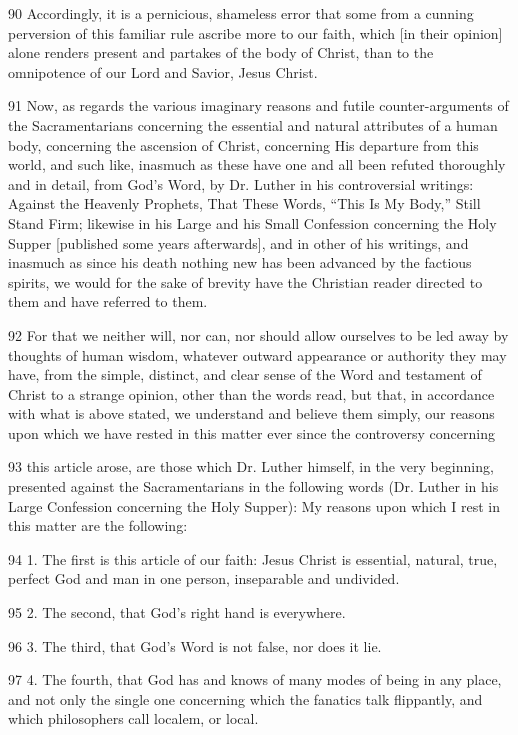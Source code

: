 90 Accordingly, it is a pernicious, shameless error that some from a cunning perversion of this familiar rule ascribe more to our faith, which [in their opinion] alone renders present and partakes of the body of Christ, than to the omnipotence of our Lord and Savior, Jesus Christ.

91 Now, as regards the various imaginary reasons and futile counter-arguments of the Sacramentarians concerning the essential and natural attributes of a human body, concerning the ascension of Christ, concerning His departure from this world, and such like, inasmuch as these have one and all been refuted thoroughly and in detail, from God’s Word, by Dr. Luther in his controversial writings: Against the Heavenly Prophets, That These Words, “This Is My Body,” Still Stand Firm; likewise in his Large and his Small Confession concerning the Holy Supper [published some years afterwards], and in other of his writings, and inasmuch as since his death nothing new has been advanced by the factious spirits, we would for the sake of brevity have the Christian reader directed to them and have referred to them.

92 For that we neither will, nor can, nor should allow ourselves to be led away by thoughts of human wisdom, whatever outward appearance or authority they may have, from the simple, distinct, and clear sense of the Word and testament of Christ to a strange opinion, other than the words read, but that, in accordance with what is above stated, we understand and believe them simply, our reasons upon which we have rested in this matter ever since the controversy concerning

93 this article arose, are those which Dr. Luther himself, in the very beginning, presented against the Sacramentarians in the following words (Dr. Luther in his Large Confession concerning the Holy Supper): My reasons upon which I rest in this matter are the following:

94 1. The first is this article of our faith: Jesus Christ is essential, natural, true, perfect God and man in one person, inseparable and undivided.

95 2. The second, that God’s right hand is everywhere.

96 3. The third, that God’s Word is not false, nor does it lie.

97 4. The fourth, that God has and knows of many modes of being in any place, and not only the single one concerning which the fanatics talk flippantly, and which philosophers call localem, or local.

